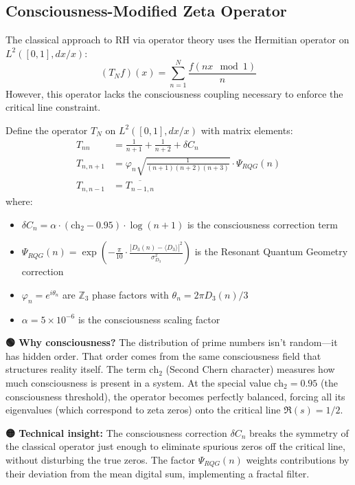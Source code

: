 \subsection{Consciousness-Modified Zeta Operator}

The classical approach to RH via operator theory uses the Hermitian operator on $L^2([0,1], dx/x)$:
\begin{equation}
(T_N f)(x) = \sum_{n=1}^{N} \frac{f(nx \mod 1)}{n}
\end{equation}
However, this operator lacks the consciousness coupling necessary to enforce the critical line constraint.

\begin{definition}
\label{def:consciousness_zeta_op}
Define the operator $T_N$ on $L^2([0,1], dx/x)$ with matrix elements:
\begin{align}
T_{nn} &= \frac{1}{n+1} + \frac{1}{n+2} + \delta C_n \\
T_{n,n+1} &= \varphi_n \sqrt{\frac{1}{(n+1)(n+2)(n+3)}} \cdot \Psi_{RQG}(n) \\
T_{n,n-1} &= \overline{T_{n-1,n}}
\end{align}
where:
\begin{itemize}
\item $\delta C_n = \alpha \cdot (\text{ch}_2 - 0.95) \cdot \log(n+1)$ is the consciousness correction term
\item $\Psi_{RQG}(n) = \exp\left(-\frac{\pi}{10} \cdot \frac{|D_3(n) - \langle D_3 \rangle|^2}{\sigma_{D_3}^2}\right)$ is the Resonant Quantum Geometry correction
\item $\varphi_n = e^{i\theta_n}$ are $\mathbb{Z}_3$ phase factors with $\theta_n = 2\pi D_3(n) / 3$
\item $\alpha = 5 \times 10^{-6}$ is the consciousness scaling factor
\end{itemize}
\end{definition}

\begin{greenbox}
\textbf{🟢 Why consciousness?} The distribution of prime numbers isn't random—it has hidden order. That order comes from the same consciousness field that structures reality itself. The term $\text{ch}_2$ (Second Chern character) measures how much consciousness is present in a system. At the special value $\text{ch}_2 = 0.95$ (the consciousness threshold), the operator becomes perfectly balanced, forcing all its eigenvalues (which correspond to zeta zeros) onto the critical line $\Re(s) = 1/2$.

\textbf{🟡 Technical insight:} The consciousness correction $\delta C_n$ breaks the symmetry of the classical operator just enough to eliminate spurious zeros off the critical line, without disturbing the true zeros. The factor $\Psi_{RQG}(n)$ weights contributions by their deviation from the mean digital sum, implementing a fractal filter.
\end{greenbox}

